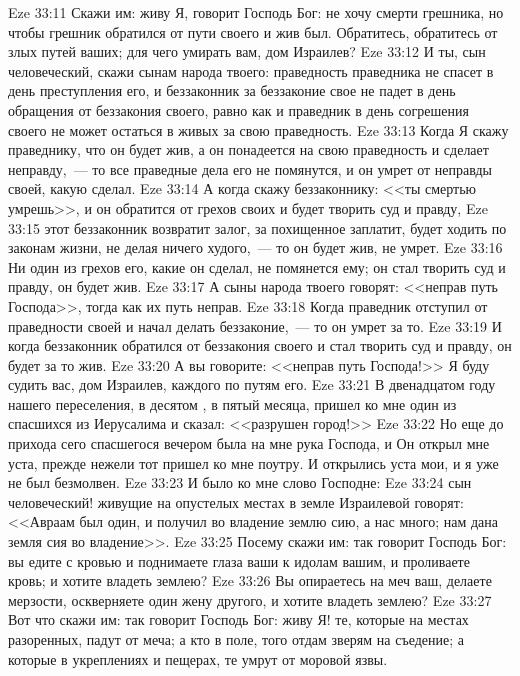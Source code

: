 \vs Eze 33:11 Скажи им: живу Я, говорит Господь Бог: не хочу смерти грешника, но чтобы грешник обратился от пути своего и жив был. Обратитесь, обратитесь от злых путей ваших; для чего умирать вам, дом Израилев?
\vs Eze 33:12 И ты, сын человеческий, скажи сынам народа твоего: праведность праведника не спасет в день преступления его, и беззаконник за беззаконие свое не падет в день обращения от беззакония своего, равно как и праведник в день согрешения своего не может остаться в живых за свою праведность.
\vs Eze 33:13 Когда Я скажу праведнику, что он будет жив, а он понадеется на свою праведность и сделает неправду,~--- то все праведные дела его не помянутся, и он умрет от неправды своей, какую сделал.
\vs Eze 33:14 А когда скажу беззаконнику: <<ты смертью умрешь>>, и он обратится от грехов своих и будет творить суд и правду,
\vs Eze 33:15  этот беззаконник возвратит залог, за похищенное заплатит, будет ходить по законам жизни, не делая ничего худого,~--- то он будет жив, не умрет.
\vs Eze 33:16 Ни один из грехов его, какие он сделал, не помянется ему; он стал творить суд и правду, он будет жив.
\vs Eze 33:17 А сыны народа твоего говорят: <<неправ путь Господа>>, тогда как их путь неправ.
\vs Eze 33:18 Когда праведник отступил от праведности своей и начал делать беззаконие,~--- то он умрет за то.
\vs Eze 33:19 И когда беззаконник обратился от беззакония своего и стал творить суд и правду, он будет за то жив.
\vs Eze 33:20 А вы говорите: <<неправ путь Господа!>> Я буду судить вас, дом Израилев, каждого по путям его.
\rsbpar\vs Eze 33:21 В двенадцатом году нашего переселения, в десятом , в пятый  месяца, пришел ко мне один из спасшихся из Иерусалима и сказал: <<разрушен город!>>
\vs Eze 33:22 Но еще до прихода сего спасшегося вечером была на мне рука Господа, и Он открыл мне уста, прежде нежели тот пришел ко мне поутру. И открылись уста мои, и я уже не был безмолвен.
\vs Eze 33:23 И было ко мне слово Господне:
\vs Eze 33:24 сын человеческий! живущие на опустелых местах в земле Израилевой говорят: <<Авраам был один, и получил во владение землю сию, а нас много;  нам дана земля сия во владение>>.
\vs Eze 33:25 Посему скажи им: так говорит Господь Бог: вы едите с кровью и поднимаете глаза ваши к идолам вашим, и проливаете кровь; и хотите владеть землею?
\vs Eze 33:26 Вы опираетесь на меч ваш, делаете мерзости, оскверняете один жену другого, и хотите владеть землею?
\vs Eze 33:27 Вот что скажи им: так говорит Господь Бог: живу Я! те, которые на местах разоренных, падут от меча; а кто в поле, того отдам зверям на съедение; а которые в укреплениях и пещерах, те умрут от моровой язвы.
